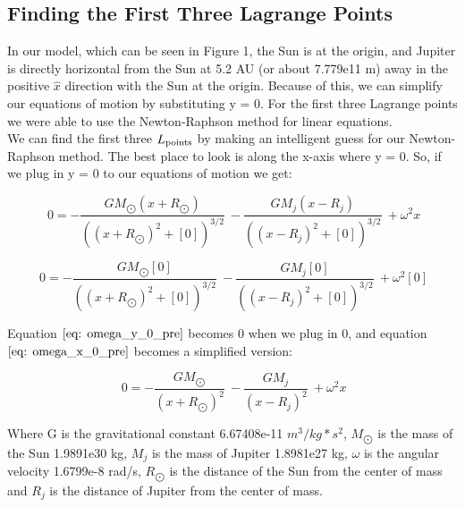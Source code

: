 \documentclass[linenumbers,RNAAS,trackchanges]{aastex631}
\begin{document}
    \subsection{\textbf{Finding the First Three Lagrange Points}}
    
    In our model, which can be seen in Figure 1, the Sun is at the origin, and Jupiter is directly horizontal from the Sun at 5.2 AU (or about 7.779e11 m) away in the positive $\hat{x}$ direction with the Sun at the origin. Because of this, we can simplify our equations of motion by substituting y = 0. For the first three Lagrange points we were able to use the Newton-Raphson method for linear equations. \\
    
    \noindent
    We can find the first three $L_{\textup{points}}$ by making an intelligent guess for our Newton-Raphson method. The best place to look is along the x-axis where y = 0. So, if we plug in y = 0 to our equations of motion we get:
    
    \begin{equation}
    \ 0 = - \frac{G M_{\bigodot} (x + R_{\bigodot})}  {((x + R_{\bigodot})^2 + [0])^{3/2}}
    \ - \frac{G M_j (x - R_j)} {((x - R_{j})^2 + [0])^{3/2}}
    \ + \omega^2 x
    \label{eq: omega_x_0_pre} \tag{1}
    \end{equation}
    
    \begin{equation}
    \ 0 = - \frac{G M_{\bigodot} [0]}  {((x + R_{\bigodot})^2 + [0])^{3/2}}
    \ - \frac{G M_j [0]} {((x - R_{j})^2 + [0])^{3/2}}
    \ + \omega^2 [0]
    \label{eq: omega_y_0_pre} \tag{2}
    \end{equation}
    
    \noindent
    Equation $\eqref{eq: omega_y_0_pre}$ becomes 0 when we plug in 0, and equation $\eqref{eq: omega_x_0_pre}$ becomes a simplified version:

    \begin{equation}
    \ 0 = - \frac{G M_{\bigodot}}{(x + R_{\bigodot})^2}
    \ - \frac{G M_j} {(x - R_{j})^2}
    \ + \omega^2 x
    \label{eq: omega_x_0_y0} \tag{3}
    \end{equation}
    
    \noindent
    Where G is the gravitational constant 6.67408e-11 $m^3/kg * s^2$, $M_{\bigodot}$ is the mass of the Sun 1.9891e30 kg, $M_j$ is the mass of Jupiter 1.8981e27 kg, $\omega$ is the angular velocity 1.6799e-8 rad/s, $R_{\bigodot}$ is the distance of the Sun from the center of mass and $R_j$ is the distance of Jupiter from the center of mass.\\
\end{document}
